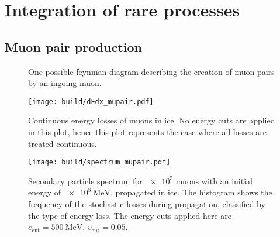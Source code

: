 \chapter{Integration of rare processes}

\section{Muon pair production}

\begin{figure}
	\centering
	
    \caption{One possible feynman diagram describing the creation of muon pairs by an ingoing muon.}
    \label{fig:feynman_mupair}
\end{figure}

\begin{figure}
    \centering
    \texttt{[image: build/dEdx\_mupair.pdf]}
    \caption{Continuous energy losses of muons in ice. No energy cuts are applied in this plot, hence this plot represents the case where all losses are treated continuous.  }
    \label{fig:dEdx_mupair}
\end{figure}

\begin{figure}
    \centering
    \texttt{[image: build/spectrum\_mupair.pdf]}
    \caption{Secondary particle spectrum for $\num{e5}$ muons with an initial energy of $\SI{e8}{\mega\electronvolt}$, propagated in ice. The histogram shows the frequency of the stochastic losses during propagation, classified by the type of energy loss. The energy cuts applied here are $e_\text{cut} = \SI{500}{\mega\electronvolt}$, $v_\text{cut} = 0.05$.}
    \label{fig:spectrum_mupair}
\end{figure}